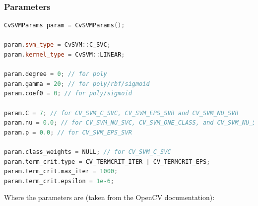 \subsubsection*{Parameters}
\begin{lstlisting}[language=C++, caption=Example CvSVMParams, label=lst:cvsvmparams]
CvSVMParams param = CvSVMParams();

param.svm_type = CvSVM::C_SVC;
param.kernel_type = CvSVM::LINEAR;

param.degree = 0; // for poly
param.gamma = 20; // for poly/rbf/sigmoid
param.coef0 = 0; // for poly/sigmoid

param.C = 7; // for CV_SVM_C_SVC, CV_SVM_EPS_SVR and CV_SVM_NU_SVR
param.nu = 0.0; // for CV_SVM_NU_SVC, CV_SVM_ONE_CLASS, and CV_SVM_NU_SVR
param.p = 0.0; // for CV_SVM_EPS_SVR

param.class_weights = NULL; // for CV_SVM_C_SVC
param.term_crit.type = CV_TERMCRIT_ITER | CV_TERMCRIT_EPS;
param.term_crit.max_iter = 1000;
param.term_crit.epsilon = 1e-6;
\end{lstlisting}
Where the parameters are (taken from the OpenCV documentation):
